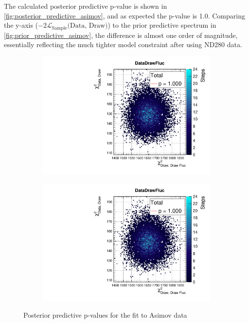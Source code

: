 The calculated posterior predictive p-value is shown in \autoref{fig:posterior_predictive_asimov}, and as expected the p-value is 1.0. Comparing the y-axis ($-2\mathcal{L}_{\text{Sample}} \text{(Data, Draw)}$) to the prior predictive spectrum in \autoref{fig:prior_predictive_asimov}, the difference is almost one order of magnitude, essentially reflecting the much tighter model constraint after using ND280 data.
\begin{figure}[h]
	\begin{subfigure}[t]{0.49\textwidth}
		\includegraphics[width=\textwidth, trim={0mm 0mm 0mm 11mm}, clip,page=1]{figures/mach3/Asimov/2017b_NewDet_3Xsec_4Det_5Flux_NewXSecTune_Asimov_merge_PostPred_procs}
	\end{subfigure}
	\begin{subfigure}[t]{0.49\textwidth}
		\includegraphics[width=\textwidth, trim={0mm 0mm 0mm 11mm}, clip,page=2]{figures/mach3/Asimov/2017b_NewDet_3Xsec_4Det_5Flux_NewXSecTune_Asimov_merge_PostPred_procs}
	\end{subfigure}
\caption{Posterior predictive p-values for the fit to Asimov data}
\label{fig:posterior_predictive_asimov}
\end{figure}

